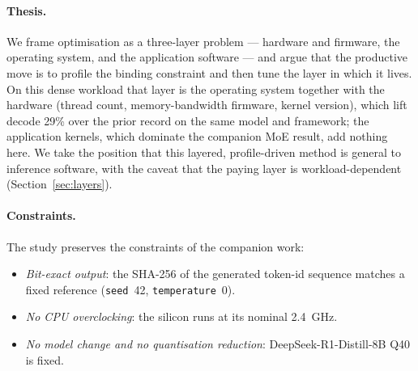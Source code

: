 \documentclass[10pt,a4paper]{article}
\begin{document}
\paragraph{Thesis.} We frame optimisation as a three-layer problem --- hardware and firmware, the operating system, and the application software --- and argue that the productive move is to profile the binding constraint and then tune the layer in which it lives. On this dense workload that layer is the operating system together with the hardware (thread count, memory-bandwidth firmware, kernel version), which lift decode 29\% over the prior record on the same model and framework; the application kernels, which dominate the companion MoE result, add nothing here. We take the position that this layered, profile-driven method is general to inference software, with the caveat that the paying layer is workload-dependent (Section~\ref{sec:layers}).

\paragraph{Constraints.} The study preserves the constraints of the companion work:
\begin{itemize}
  \item \emph{Bit-exact output}: the SHA-256 of the generated token-id sequence matches a fixed reference (\texttt{seed}~42, \texttt{temperature}~0).
  \item \emph{No CPU overclocking}: the silicon runs at its nominal 2.4~GHz.
  \item \emph{No model change and no quantisation reduction}: DeepSeek-R1-Distill-8B Q40 is fixed.
\end{itemize}
\end{document}
